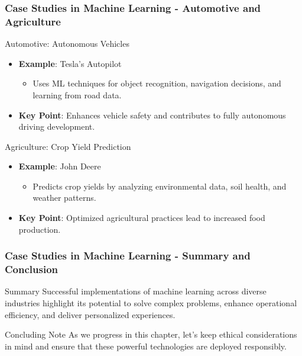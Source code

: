 \documentclass[aspectratio=169]{beamer}
\begin{document}
\begin{frame}[fragile]
    \frametitle{Case Studies in Machine Learning - Automotive and Agriculture}
    \begin{block}{Automotive: Autonomous Vehicles}
        \begin{itemize}
            \item \textbf{Example}: Tesla's Autopilot
            \begin{itemize}
                \item Uses ML techniques for object recognition, navigation decisions, and learning from road data.
            \end{itemize}
            \item \textbf{Key Point}: Enhances vehicle safety and contributes to fully autonomous driving development.
        \end{itemize}
    \end{block}

    \begin{block}{Agriculture: Crop Yield Prediction}
        \begin{itemize}
            \item \textbf{Example}: John Deere
            \begin{itemize}
                \item Predicts crop yields by analyzing environmental data, soil health, and weather patterns.
            \end{itemize}
            \item \textbf{Key Point}: Optimized agricultural practices lead to increased food production.
        \end{itemize}
    \end{block}
\end{frame}

\begin{frame}[fragile]
    \frametitle{Case Studies in Machine Learning - Summary and Conclusion}
    \begin{block}{Summary}
        Successful implementations of machine learning across diverse industries highlight its potential to solve complex problems, enhance operational efficiency, and deliver personalized experiences.
    \end{block}

    \begin{block}{Concluding Note}
        As we progress in this chapter, let’s keep ethical considerations in mind and ensure that these powerful technologies are deployed responsibly.
    \end{block}
\end{frame}
\end{document}
